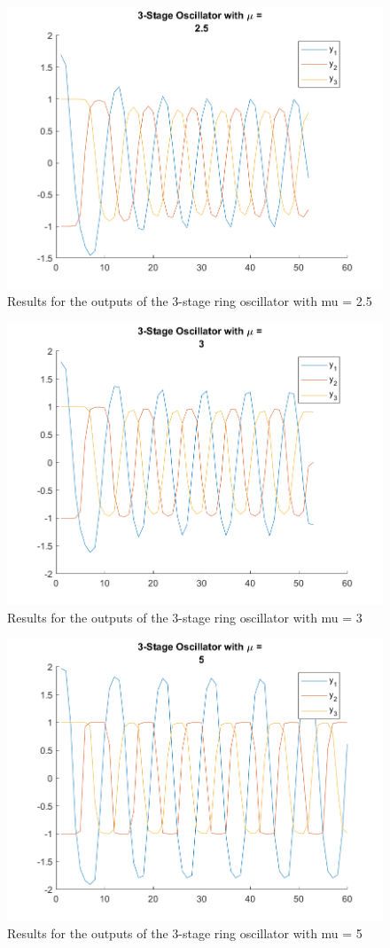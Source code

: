 \documentclass[letter]{article}
\begin{document}
\begin{figure}[p]
	\centering
	\includegraphics[width=0.7\linewidth]{fig/HW6_pblm3_results_mu_2.5}
	\caption{Results for the outputs of the 3-stage ring oscillator with mu = 2.5}
	\label{fig:pblm3_mu25}
\end{figure}

\begin{figure}[p]
	\centering
	\includegraphics[width=0.7\linewidth]{fig/HW6_pblm3_results_mu_3}
	\caption{Results for the outputs of the 3-stage ring oscillator with mu = 3}
	\label{fig:pblm3_mu3}
\end{figure}

\begin{figure}[p]
	\centering
	\includegraphics[width=0.7\linewidth]{fig/HW6_pblm3_results_mu_5}
	\caption{Results for the outputs of the 3-stage ring oscillator with mu = 5}
	\label{fig:pblm3_mu5}
\end{figure}
\end{document}
